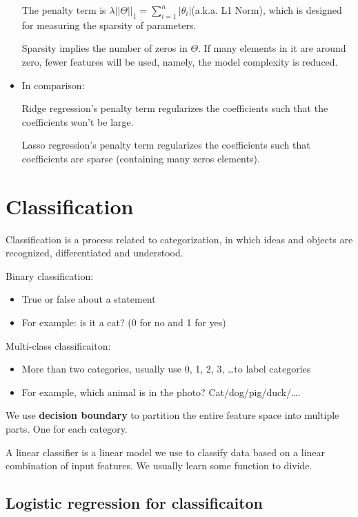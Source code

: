 \documentclass[letterpaper,12pt]{article}
\begin{document}
\begin{itemize}
          The penalty term is $\lambda||\Theta||_1=\sum_{i=1}^{n}|\theta_i| $(a.k.a. L1
          Norm), which is designed for measuring the sparsity of parameters.

          Sparsity implies the number of zeros in $\Theta$. If many elements in it are
          around zero, fewer features will be used, namely, the model complexity is
          reduced.

    \item In comparison:

          Ridge regression's penalty term regularizes the coefficients such that the
          coefficients won't be large.

          Lasso regression's penalty term regularizes the coefficients such that
          coefficients are sparse (containing many zeros elements).
\end{itemize}

\section{Classification}

Classification is a process related to categorization, in which ideas and
objects are recognized, differentiated and understood.

Binary classification:
\begin{itemize}
    \item True or false about a statement
    \item For example: is it a cat? (0 for no and 1 for yes)
\end{itemize}

Multi-class classificaiton:
\begin{itemize}
    \item More than two categories, usually use 0, 1, 2, 3, \ldots to label categories
    \item For example, which animal is in the photo? Cat/dog/pig/duck/\ldots.
\end{itemize}

We use \textbf{decision boundary} to partition the entire feature space into
multiple parts. One for each category.

A linear classifier is a linear model we use to classify data based on a linear
combination of input features. We usually learn some function to divide.

\subsection{Logistic regression for classificaiton}
\end{document}
